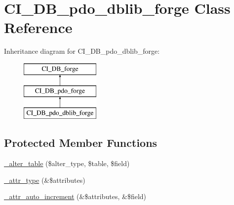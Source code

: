 \hypertarget{class_c_i___d_b__pdo__dblib__forge}{}\section{C\+I\+\_\+\+D\+B\+\_\+pdo\+\_\+dblib\+\_\+forge Class Reference}
\label{class_c_i___d_b__pdo__dblib__forge}
Inheritance diagram for C\+I\+\_\+\+D\+B\+\_\+pdo\+\_\+dblib\+\_\+forge\+:\begin{figure}[H]
\begin{center}
\leavevmode
\includegraphics[height=3.000000cm]{class_c_i___d_b__pdo__dblib__forge}
\end{center}
\end{figure}
\subsection*{Protected Member Functions}
\begin{DoxyCompactItemize}
\item 
\mbox{\hyperlink{class_c_i___d_b__pdo__dblib__forge_a41c6cae02f2fda8b429ad0afb9509426}{\+\_\+alter\+\_\+table}} (\$alter\+\_\+type, \$table, \$field)
\item 
\mbox{\hyperlink{class_c_i___d_b__pdo__dblib__forge_a8553be952084c6f7cdfff370a1d14f6b}{\+\_\+attr\+\_\+type}} (\&\$attributes)
\item 
\mbox{\hyperlink{class_c_i___d_b__pdo__dblib__forge_a2a013a5932439c3c44f0dad3436525f7}{\+\_\+attr\+\_\+auto\+\_\+increment}} (\&\$attributes, \&\$field)
\end{DoxyCompactItemize}
